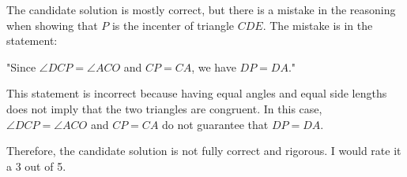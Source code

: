 The candidate solution is mostly correct, but there is a mistake in the reasoning when showing that $P$ is the incenter of triangle $CDE$. The mistake is in the statement:

"Since $\angle DCP = \angle ACO$ and $CP = CA$, we have $DP = DA$."

This statement is incorrect because having equal angles and equal side lengths does not imply that the two triangles are congruent. In this case, $\angle DCP = \angle ACO$ and $CP = CA$ do not guarantee that $DP = DA$. 

Therefore, the candidate solution is not fully correct and rigorous. I would rate it a 3 out of 5.
